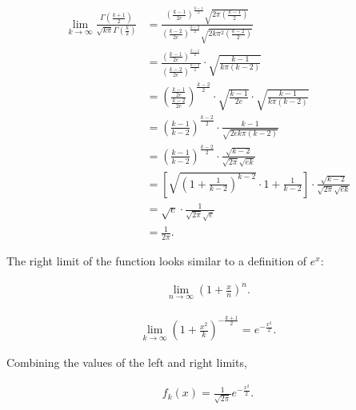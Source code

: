 \documentclass[12pt,a4paper]{article}
\begin{document}
\begin{align*}
	\lim _{k\rightarrow\infty}\frac{\Gamma(\frac{k+1}{2})}{\sqrt{k\pi}\Gamma(\frac{k}{2})}&=\frac{\left(\frac{k-1}{2e}\right)^{\frac{k-1}{2}}\sqrt{2\pi\left(\frac{k-1}{2}\right)}}{\left(\frac{k-2}{2e}\right)^{\frac{k-2}{2}}\sqrt{2k\pi^2\left(\frac{k-2}{2}\right)}} \\
	&=\frac{\left(\frac{k-1}{2e}\right)^{\frac{k-1}{2}}}{\left(\frac{k-2}{2e}\right)^{\frac{k-2}{2}}}\cdot\sqrt{\frac{k-1}{k\pi(k-2)}} \\
	&=\left(\frac{\frac{k-1}{2e}}{\frac{k-2}{2e}}\right)^{\frac{k-2}{2}}\cdot\sqrt{\frac{k-1}{2e}}\cdot\sqrt{\frac{k-1}{k\pi(k-2)}} \\
	&=\left(\frac{k-1}{k-2}\right)^{\frac{k-2}{2}}\cdot\frac{k-1}{\sqrt{2ek\pi(k-2)}} \\
	&=\left(\frac{k-1}{k-2}\right)^{\frac{k-2}{2}}\cdot\frac{\sqrt{k-2}}{\sqrt{2\pi}\sqrt{ek}} \\
	&=\left[\sqrt{\left(1+\frac{1}{k-2}\right)^{k-2}}\cdot1+\frac{1}{k-2}\right]\cdot\frac{\sqrt{k-2}}{\sqrt{2\pi}\sqrt{ek}} \\
	&=\sqrt{e}\cdot\frac{1}{\sqrt{2\pi}\sqrt{e}} \\
	&=\frac{1}{2\pi}.
\end{align*}

The right limit of the function looks similar to a definition of $e^x$:

\begin{align*}
	\lim_{n\rightarrow\infty}\left(1+\frac{x}{n}\right)^n.
\end{align*}

\begin{align*}
	\lim_{k\rightarrow\infty}\left(1+\frac{x^2}{k}\right)^{-\frac{k+1}{2}}=e^{-\frac{x^2}{2}}.
\end{align*}

Combining the values of the left and right limits,

\begin{align*}
	f_k(x)=\frac{1}{\sqrt{2\pi}}e^{-\frac{x^2}{2}}.
\end{align*}
\end{document}
